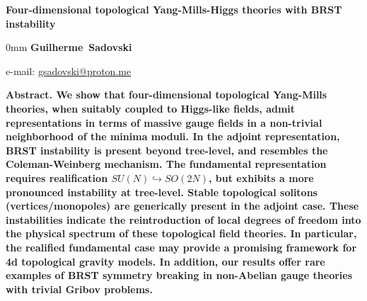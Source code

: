 \documentclass[main.tex]{subfiles}
\begin{document}
\thispagestyle{empty}
{
  \raggedright %
  \Large
  \bfseries
  Four-dimensional topological Yang-Mills-Higgs theories with BRST instability\par %
  \bigskip
  \bigskip
}

\begin{addmargin}[6mm]{0mm}
  {
    \noindent
    \bfseries
    Guilherme~Sadovski
    \bigskip
  }

  {
    \noindent
    \footnotesize
    \rmfamily
    e-mail: \href{mailto:gsadovski@proton.me}{gsadovski@proton.me}
    \bigskip
  }

  {
    \noindent
    \bfseries
    Abstract.\normalfont{} We show that four-dimensional topological Yang-Mills theories, when suitably coupled to Higgs-like fields, admit representations in terms of massive gauge fields in a non-trivial neighborhood of the minima moduli. In the adjoint representation, BRST instability is present beyond tree-level, and resembles the Coleman-Weinberg mechanism. The fundamental representation requires realification $SU(N) \hookrightarrow SO(2N)$, but exhibits a more pronounced instability at tree-level. Stable topological solitons (vertices/monopoles) are generically present in the adjoint case. These instabilities indicate the reintroduction of local degrees of freedom into the physical spectrum of these topological field theories. In particular, the realified fundamental case may provide a promising framework for 4d topological gravity models. In addition, our results offer rare examples of BRST symmetry breaking in non-Abelian gauge theories with trivial Gribov problems.
  }
\end{addmargin}
\end{document}
